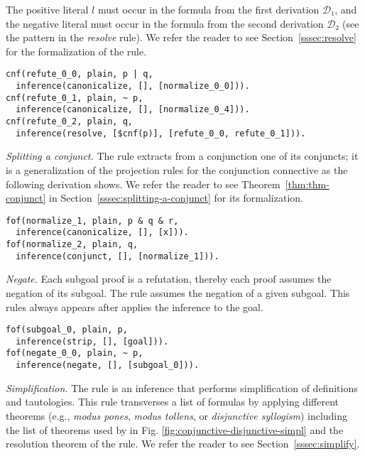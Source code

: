 The positive literal $l$ must occur in
the formula from the first derivation $\mathcal{D}₁$, and the
negative literal must occur in the formula from the second derivation $\mathcal{D}₂$ (see the pattern in the \emph{resolve} rule).
We refer the reader to see Section~\ref{sssec:resolve} for the formalization of the \resolve rule.

\begin{verbatim}
cnf(refute_0_0, plain, p | q,
  inference(canonicalize, [], [normalize_0_0])).
cnf(refute_0_1, plain, ~ p,
  inference(canonicalize, [], [normalize_0_4])).
cnf(refute_0_2, plain, q,
  inference(resolve, [$cnf(p)], [refute_0_0, refute_0_1])).
\end{verbatim}


\textit{Splitting a conjunct.} The \conjunct rule extracts from a
conjunction one of its conjuncts; it is a generalization of the
projection rules for the conjunction connective as the
following \TSTP derivation shows.
We refer the reader to see Theorem~\ref{thm:thm-conjunct}
in Section~\ref{sssec:splitting-a-conjunct} for its formalization.

\begin{verbatim}
fof(normalize_1, plain, p & q & r,
  inference(canonicalize, [], [x])).
fof(normalize_2, plain, q,
  inference(conjunct, [], [normalize_1])).
\end{verbatim}

\textit{Negate.}
Each subgoal proof is a refutation, thereby each proof assumes
the negation of its subgoal. The \negate rule
assumes the negation of a given subgoal. This rules always
appears after applies the \strip inference to the goal.

\begin{verbatim}
fof(subgoal_0, plain, p,
  inference(strip, [], [goal])).
fof(negate_0_0, plain, ~ p,
  inference(negate, [], [subgoal_0])).
\end{verbatim}


\textit{Simplification.}
The \simplify rule is an inference that performs simplification of
definitions and tautologies. This rule
transverses a list of formulas by applying different theorems (e.g.,
\emph{modus pones}, \emph{modus tollens}, or \emph{disjunctive
syllogism}) including the list of theorems used by \canonicalize in
Fig. \ref{fig:conjunctive-disjunctive-simpl} and the resolution
theorem of the \resolve rule.
We refer the reader to see Section~\ref{sssec:simplify}.
